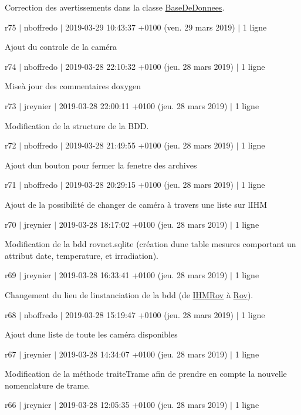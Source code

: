 Correction des avertissements dans la classe \hyperlink{class_base_de_donnees}{Base\+De\+Donnees}.

r75 $\vert$ nboffredo $\vert$ 2019-\/03-\/29 10\+:43\+:37 +0100 (ven. 29 mars 2019) $\vert$ 1 ligne

Ajout du controle de la caméra

r74 $\vert$ nboffredo $\vert$ 2019-\/03-\/28 22\+:10\+:32 +0100 (jeu. 28 mars 2019) $\vert$ 1 ligne

Miseà jour des commentaires doxygen

r73 $\vert$ jreynier $\vert$ 2019-\/03-\/28 22\+:00\+:11 +0100 (jeu. 28 mars 2019) $\vert$ 1 ligne

Modification de la structure de la B\+DD.

r72 $\vert$ nboffredo $\vert$ 2019-\/03-\/28 21\+:49\+:55 +0100 (jeu. 28 mars 2019) $\vert$ 1 ligne

Ajout d\textquotesingle{}un bouton pour fermer la fenetre des archives

r71 $\vert$ nboffredo $\vert$ 2019-\/03-\/28 20\+:29\+:15 +0100 (jeu. 28 mars 2019) $\vert$ 1 ligne

Ajout de la possibilité de changer de caméra à travers une liste sur l\textquotesingle{}I\+HM

r70 $\vert$ jreynier $\vert$ 2019-\/03-\/28 18\+:17\+:02 +0100 (jeu. 28 mars 2019) $\vert$ 1 ligne

Modification de la bdd rovnet.\+sqlite (création d\textquotesingle{}une table mesures comportant un attribut date, temperature, et irradiation).

r69 $\vert$ jreynier $\vert$ 2019-\/03-\/28 16\+:33\+:41 +0100 (jeu. 28 mars 2019) $\vert$ 1 ligne

Changement du lieu de l\textquotesingle{}instanciation de la bdd (de \hyperlink{class_i_h_m_rov}{I\+H\+M\+Rov} à \hyperlink{class_rov}{Rov}).

r68 $\vert$ nboffredo $\vert$ 2019-\/03-\/28 15\+:19\+:47 +0100 (jeu. 28 mars 2019) $\vert$ 1 ligne

Ajout d\textquotesingle{}une liste de toute les caméra disponibles

r67 $\vert$ jreynier $\vert$ 2019-\/03-\/28 14\+:34\+:07 +0100 (jeu. 28 mars 2019) $\vert$ 1 ligne

Modification de la méthode traite\+Trame afin de prendre en compte la nouvelle nomenclature de trame.

r66 $\vert$ jreynier $\vert$ 2019-\/03-\/28 12\+:05\+:35 +0100 (jeu. 28 mars 2019) $\vert$ 1 ligne

